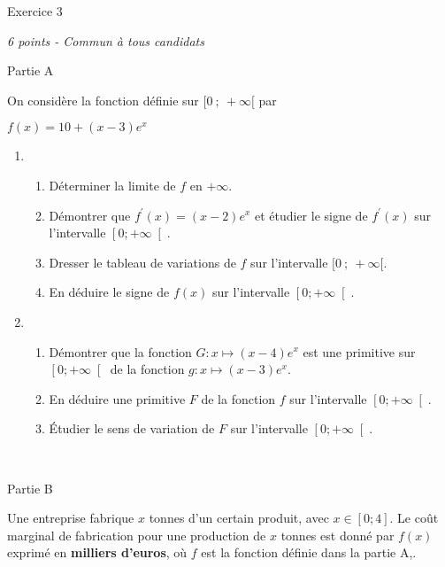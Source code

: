 
%
\begin{h2}Exercice 3\end{h2}
\textit{6 points - Commun à tous candidats }
\begin{h3}Partie A\end{h3}
On considère la fonction définie sur $ [ 0~;~+\infty [ $ par

\begin{center}
$f\left(x\right)= 10+\left(x-3\right)e^{x}$
\end{center}

\begin{enumerate}
     \item
     \begin{enumerate}[label=\alph*.]
          \item
          Déterminer la limite de $f$ en $+ \infty $.
          \item
          Démontrer que $f^{\prime}\left(x\right)=\left(x-2\right)e^{x}$ et étudier le signe de $f^{\prime}\left(x\right)$ sur l'intervalle $ \left[0  ; +\infty \right[$.
          \item
          Dresser le tableau de variations de $ f $ sur l'intervalle $ [ 0~;~+\infty [ $.
          \item
          En déduire le signe de $f\left(x\right)$ sur l'intervalle $\left[0  ; +\infty \right[$.
     \end{enumerate}
     \item
     \begin{enumerate}[label=\alph*.]
          \item
          Démontrer que la fonction $G : x \mapsto   \left(x-4 \right)e^{x}$ est une primitive sur $\left[0  ; +\infty \right[$ de la fonction $g : x \mapsto  \left(x-3 \right)e^{x}$.
          \item
          En déduire une primitive $F$ de la fonction $f$ sur l'intervalle $\left[0  ; +\infty \right[$.
          \item
          Étudier le sens de variation de $F$ sur l'intervalle $\left[0  ; +\infty \right[$.
     \end{enumerate}
\end{enumerate}
 
\begin{h3}Partie B\end{h3}
Une entreprise fabrique $x$ tonnes d'un certain produit, avec $x\in \left[0  ; 4\right]$. Le coût marginal de fabrication pour une production de $x$ tonnes est donné par $f\left(x\right)$ exprimé en \textbf{milliers d'euros}, où $f$ est la fonction définie dans la partie A,.
